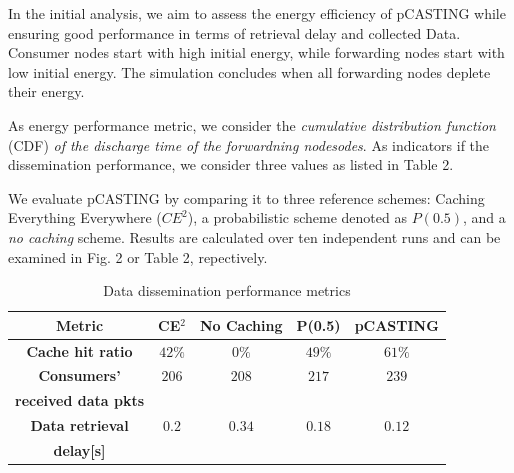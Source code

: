 \documentclass[conference]{IEEEtran}
\begin{document}
In the initial analysis, we aim to assess the energy efficiency of pCASTING while ensuring good performance in terms of retrieval delay and 
collected Data. Consumer nodes start with high initial energy, while forwarding nodes start with low initial energy. The simulation concludes 
when all forwarding nodes deplete their energy.

As energy performance metric, we consider the \textit{cumulative distribution function} (CDF) \textit{of the discharge time of the forwardning nodesodes}.
As indicators if the dissemination performance, we consider three values as listed in Table 2.

We evaluate pCASTING by comparing it to three reference schemes:
Caching Everything Everywhere ($CE^2$),
a probabilistic scheme denoted as $P(0.5)$,
and a \textit{no caching} scheme.
Results are calculated over ten independent runs and can be examined in Fig. 2 or Table 2, repectively.


\begin{table}[htbp]
    \caption{Data dissemination performance metrics}
    \begin{center}
    \begin{tabular}{c|c|c|c|c|}
    \textbf{Metric} & \textbf{CE$^\text{2}$}& \textbf{No Caching} & \textbf{P(0.5)} & \textbf{pCASTING} \\
    \hline
    \textbf{Cache hit ratio} & $42 \%$ & $0 \%$ & $49 \%$ & $61 \%$ \\
    \hline
    \textbf{Consumers'} & $206$ & $208$ & $217$ & $239$ \\
    \textbf{received data pkts} & & & & \\
    \hline
    \textbf{Data retrieval} & $0.2$ & $0.34$ & $0.18$ & $0.12$ \\
    \textbf{delay[s]} & & & & \\
    \hline
    \end{tabular}
    \label{tab2}
    \end{center}
\end{table}


\end{document}

